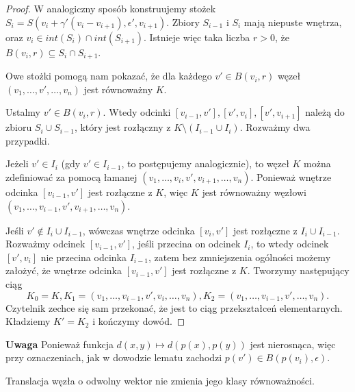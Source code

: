 \begin{proof}
 
W analogiczny sposób konstruujemy stożek $S_i = S(v_i + \gamma'(v_i - v_{i+1}), \epsilon', v_{i+1})$. Zbiory $S_{i-1}$ i $S_i$ mają niepuste wnętrza, oraz
$v_i\in int(S_i)\cap int(S_{i+1})$. Istnieje więc taka liczba $r>0$, że $B(v_i, r)\subseteq S_i\cap S_{i+1}$.
 
Owe stożki pomogą nam pokazać, że dla każdego $v'\in B(v_i, r)$ węzeł $(v_1, \ldots, v', \ldots, v_n)$ jest równoważny $K$.
 
Ustalmy $v'\in B(v_i, r)$. Wtedy odcinki $[v_{i-1}, v'], [v',v_i], [v', v_{i+1}]$ należą do zbioru $S_i\cup S_{i-1}$, który jest rozłączny z $K\setminus(I_{i-1}\cup I_i)$.
Rozważmy dwa przypadki.
 
Jeżeli $v'\in I_i$ (gdy $v'\in I_{i-1}$, to postępujemy analogicznie), to węzeł $K$ można zdefiniować za pomocą łamanej $(v_1, \ldots, v_i, v', v_{i+1}, \ldots, v_n)$. Ponieważ
wnętrze odcinka $[v_{i-1}, v']$ jest rozłączne z $K$, więc $K$ jest równoważny węzłowi $(v_1, \ldots, v_{i-1}, v', v_{i+1}, \ldots, v_n)$.
 
Jeśli $v'\not\in I_i\cup I_{i-1}$, wówczas wnętrze odcinka $[v_i, v']$ jest rozłączne z $I_i\cup I_{i-1}$. Rozważmy odcinek $[v_{i-1}, v']$, jeśli przecina on odcinek $I_i$, to
wtedy odcinek $[v', v_i]$ nie przecina odcinka $I_{i-1}$, zatem bez zmniejszenia ogólności możemy założyć, że wnętrze odcinka $[v_{i-1}, v']$ jest rozłączne z $K$. Tworzymy
następujący ciąg
\begin{displaymath}
 K_0 = K, K_1 = (v_1,\ldots, v_{i-1}, v', v_i, \ldots, v_n), K_2 = (v_1,\ldots, v_{i-1}, v', \ldots, v_n).
\end{displaymath}
Czytelnik zechce się sam przekonać, że jest to ciąg przekształceń elementarnych.
Kładziemy $K' = K_2$ i kończymy dowód.
\end{proof}
\textbf{Uwaga} Ponieważ funkcja
 $ d(x,y)\mapsto d(p(x), p(y))$ jest nierosnąca, więc przy oznaczeniach, jak w dowodzie lematu zachodzi $p(v')\in B(p(v_i),\epsilon)$.
\begin{wniosek}
 Translacja węzła o odwolny wektor nie zmienia jego klasy równoważności.
\end{wniosek}
 
